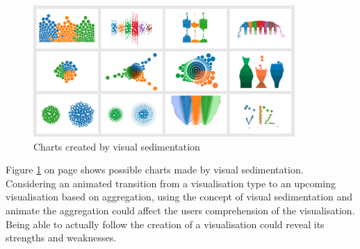 \begin{figure}[!htb]
\centering
\includegraphics[height=5cm]{images/methods/related/visual-sedimentation}
\caption[
    Charts created by visual sedimentation .
]{Charts created by visual sedimentation}
\label{fig:visual-sedimentation}
\end{figure}
\cbstart
Figure \ref{fig:visual-sedimentation} on page \pageref{fig:visual-sedimentation} shows possible charts made by visual sedimentation. Considering an animated transition from a visualisation type to an upcoming visualisation based on aggregation, using the concept of visual sedimentation and animate the aggregation could affect the users comprehension of the visualisation. Being able to actually follow the creation of a visualisation could reveal its strengths and weaknesses.
\cbend